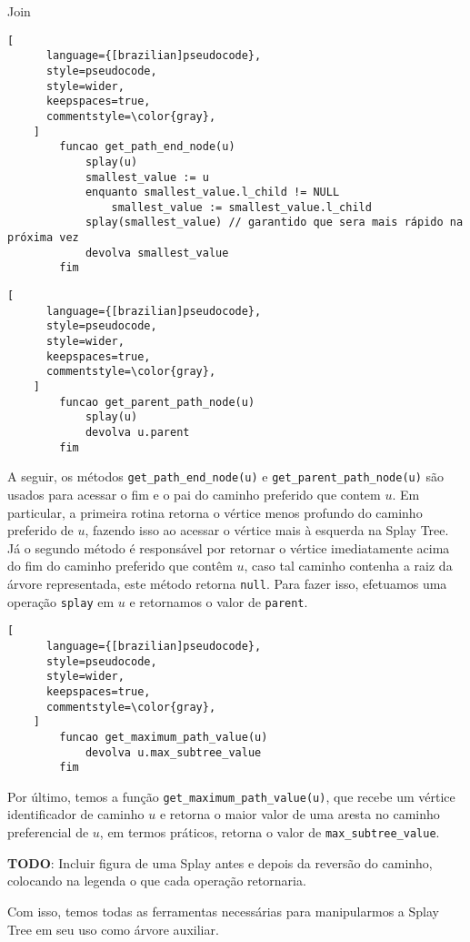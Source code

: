 \begin{programruledcaption}{Join\label{splay:get-path-end}}
    \begin{lstlisting}[
      language={[brazilian]pseudocode},
      style=pseudocode,
      style=wider,
      keepspaces=true,
      commentstyle=\color{gray},
    ]
        funcao get_path_end_node(u)
            splay(u)
            smallest_value := u
            enquanto smallest_value.l_child != NULL
                smallest_value := smallest_value.l_child
            splay(smallest_value) // garantido que sera mais rápido na próxima vez
            devolva smallest_value
        fim
    \end{lstlisting}
\end{programruledcaption}

\begin{programruledcaption}{\label{splay:get-parent-path}}
    \begin{lstlisting}[
      language={[brazilian]pseudocode},
      style=pseudocode,
      style=wider,
      keepspaces=true,
      commentstyle=\color{gray},
    ]
        funcao get_parent_path_node(u)
            splay(u)
            devolva u.parent
        fim
    \end{lstlisting}
\end{programruledcaption}

A seguir, os métodos \texttt{get\_path\_end\_node(u)} e \texttt{get\_parent\_path\_node(u)} são usados para acessar o fim e o pai do caminho preferido que contem $u$. Em particular, a primeira rotina retorna o vértice menos profundo do caminho preferido de $u$, fazendo isso ao acessar o vértice mais à esquerda na Splay Tree. Já o segundo método é responsável por retornar o vértice imediatamente acima do fim do caminho preferido que contêm $u$, caso tal caminho contenha a raiz da árvore representada, este método retorna \texttt{null}. Para fazer isso, efetuamos uma operação \texttt{splay} em $u$ e retornamos o valor de \texttt{parent}.

\begin{programruledcaption}{\label{splay:get-maximum-value}}
    \begin{lstlisting}[
      language={[brazilian]pseudocode},
      style=pseudocode,
      style=wider,
      keepspaces=true,
      commentstyle=\color{gray},
    ]
        funcao get_maximum_path_value(u)
            devolva u.max_subtree_value
        fim
    \end{lstlisting}
\end{programruledcaption}

Por último, temos a função \texttt{get\_maximum\_path\_value(u)}, que recebe um vértice identificador de caminho $u$ e retorna o maior valor de uma aresta no caminho preferencial de $u$, em termos práticos, retorna o valor de \texttt{max\_subtree\_value}.

\begin{center}
    \textbf{TODO}: Incluir figura de uma Splay antes e depois da reversão do caminho, colocando na legenda o que cada operação retornaria.
\end{center}

Com isso, temos todas as ferramentas necessárias para manipularmos a Splay Tree em seu uso como árvore auxiliar.